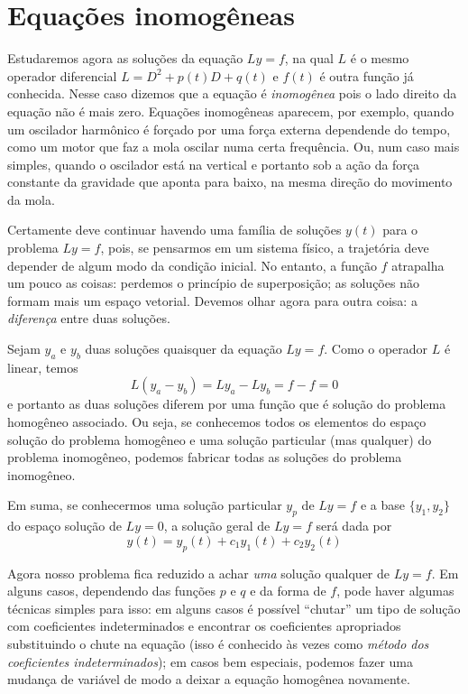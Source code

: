 \documentclass[12pt,a4paper,oneside]{memoir}
\begin{document}

\section{Equações inomogêneas}

Estudaremos agora as soluções da equação $Ly = f$, na qual $L$ é o mesmo operador diferencial $L = D^2 + p(t) D + q(t)$ e $f(t)$ é outra função já conhecida.  Nesse caso dizemos que a equação é \emph{inomogênea} pois o lado direito da equação não é mais zero.  Equações inomogêneas aparecem, por exemplo, quando um oscilador harmônico é forçado por uma força externa dependende do tempo, como um motor que faz a mola oscilar numa certa frequência.  Ou, num caso mais simples, quando o oscilador está na vertical e portanto sob a ação da força constante da gravidade que aponta para baixo, na mesma direção do movimento da mola.

Certamente deve continuar havendo uma família de soluções $y(t)$ para o problema $Ly = f$, pois, se pensarmos em um sistema físico, a trajetória deve depender de algum modo da condição inicial.  No entanto, a função $f$ atrapalha um pouco as coisas: perdemos o princípio de superposição; as soluções não formam mais um espaço vetorial.  Devemos olhar agora para outra coisa: a \emph{diferença} entre duas soluções.

Sejam $y_a$ e $y_b$ duas soluções quaisquer da equação $Ly = f$.  Como o operador $L$ é linear, temos
\[
  L(y_a - y_b) = Ly_a - Ly_b = f - f = 0
\]
e portanto as duas soluções diferem por uma função que é solução do problema homogêneo associado.  Ou seja, se conhecemos todos os elementos do espaço solução do problema homogêneo e uma solução particular (mas qualquer) do problema inomogêneo, podemos fabricar todas as soluções do problema inomogêneo.

Em suma, se conhecermos uma solução particular $y_p$ de $Ly = f$ e a base $\{y_1, y_2\}$ do espaço solução de $Ly = 0$, a solução geral de $Ly = f$ será dada por
\begin{equation}
  y(t) = y_p(t) + c_1 y_1(t) + c_2 y_2(t)
\end{equation}

Agora nosso problema fica reduzido a achar \emph{uma} solução qualquer de $Ly = f$.  Em alguns casos, dependendo das funções $p$ e $q$ e da forma de $f$, pode haver algumas técnicas simples para isso: em alguns casos é possível ``chutar'' um tipo de solução com coeficientes indeterminados e encontrar os coeficientes apropriados substituindo o chute na equação (isso é conhecido às vezes como \emph{método dos coeficientes indeterminados}); em casos bem especiais, podemos fazer uma mudança de variável de modo a deixar a equação homogênea novamente.
\end{document}
